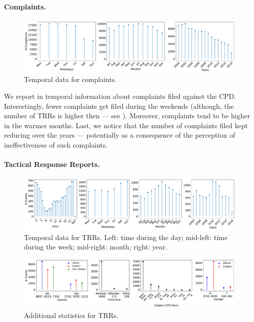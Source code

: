 \paragraph{Complaints.} 
\begin{figure}[h] 
	\includegraphics[width=\textwidth]{figs/complaints_times} 
	\caption{Temporal data for complaints.} \label{fig:complaints}
\end{figure}
We report in  temporal information about complaints filed against the CPD. Interestingly, fewer complaints get filed during the weekends (although, the number of TRRs is higher then --- see ). Moreover, complaints tend to be higher in the warmer months. Last, we notice that the number of complaints filed kept reducing over the years --- potentially as a consequence of the perception of ineffectiveness of such complaints.

\paragraph{Tactical Response Reports.}

\begin{figure}[h] 
	\includegraphics[width=\textwidth]{figs/trrs_times} 
	\caption{Temporal data for TRRs. Left: time during the day; mid-left: time during the week; mid-right: month; right: year.} \label{fig:trrs_times}
\end{figure}

\begin{figure}[h] 
	\includegraphics[width=\textwidth]{figs/trr_stats} 
	\caption{Additional statistics for TRRs.} \label{fig:trrs_stats1}
\end{figure}

